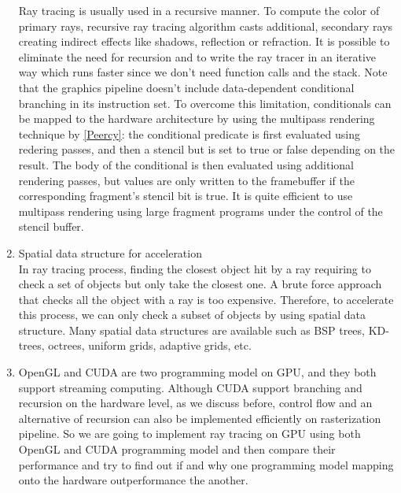 \begin{enumerate}
    Ray tracing is usually used in a recursive manner. To compute the color of primary rays, recursive ray tracing algorithm casts additional, secondary rays creating indirect effects like shadows, reflection or refraction. It is possible to eliminate the need for recursion and to write the ray tracer in an iterative way which runs faster since we don't need function calls and the stack. Note that the graphics pipeline doesn't include data-dependent conditional branching in its instruction set. To overcome this limitation, conditionals can be mapped to the hardware architecture by using the multipass rendering technique by \ref{Peercy}: the conditional predicate is first evaluated using redering passes, and then a stencil but is set to true or false depending on the result. The body of the conditional is then evaluated using additional rendering passes, but values are only written to the framebuffer if the corresponding fragment's stencil bit is true. It is quite efficient to use multipass rendering using large fragment programs under the control of the stencil buffer.
    \item Spatial data structure for acceleration\\
    In ray tracing process, finding the closest object hit by a ray requiring to check a set of objects but only take the closest one. A brute force approach that checks all the object with a ray is too expensive. Therefore, to accelerate this process, we can only check a subset of objects by using spatial data structure. Many spatial data structures are available such as BSP trees, KD-trees, octrees, uniform grids, adaptive grids, etc. 
    \item OpenGL and CUDA are two programming model on GPU, and they both support streaming computing. Although CUDA support branching and recursion on the hardware level, as we discuss before, control flow and an alternative of recursion can also be implemented efficiently on rasterization pipeline. So we are going to implement ray tracing on GPU using both OpenGL and CUDA programming model and then compare their performance and try to find out if and why one programming model mapping onto the hardware outperformance the another. 
    
\end{enumerate}
